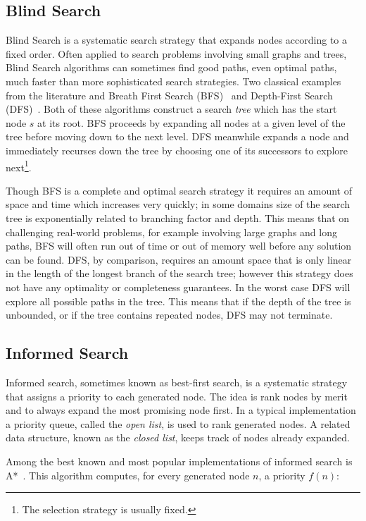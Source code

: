 \subsection{Blind Search}
\label{cha::lit::search::blind}
Blind Search is a systematic search strategy that expands nodes according to 
a fixed order. Often applied to search problems involving small graphs and trees, 
Blind Search algorithms can sometimes find good paths, even optimal paths, much 
faster than more sophisticated search strategies.
 Two classical examples from the literature and Breath First Search 
(BFS)~\citep{moore59} and Depth-First Search (DFS)~\citep{russel03}.  Both of
these algorithms construct a search \emph{tree} which has the start node $s$
at its root. BFS proceeds by expanding all nodes at a given level of the tree
before moving down to the next level. DFS meanwhile expands a node and
immediately recurses down the tree by choosing one of its successors to
explore next\footnote{The selection strategy is usually fixed.}.

Though BFS is a complete and optimal search strategy it requires an amount of
space and time which increases very quickly; in some domains size of the
search tree is exponentially related to branching factor and depth.  This
means that on challenging real-world problems, for example involving large
graphs and long paths, BFS will often run out of time or out of memory well
before any solution can be found.  DFS, by comparison, requires an amount
space that is only linear in the length of the longest branch of the search
tree; however this strategy does not have any optimality or completeness
guarantees.  In the worst case DFS will explore all possible paths in the
tree. This means that if the depth of the tree is unbounded, or if the tree
contains repeated nodes, DFS may not terminate.

\subsection{Informed Search}
\label{cha::lit::search::informed}
Informed search, sometimes known as best-first search, is a systematic strategy
that assigns a priority to each generated node. The idea is rank nodes by merit 
and to always expand the most promising node first.
In a typical implementation a priority queue, called the 
\emph{open list}, is used to rank generated nodes. A related data structure, 
known as the \emph{closed list}, keeps track of nodes already expanded.

Among the best known and most popular implementations of informed search is 
A{*}~\citep{hart68}. This algorithm computes, for every generated node $n$, a 
priority $f(n)$:

